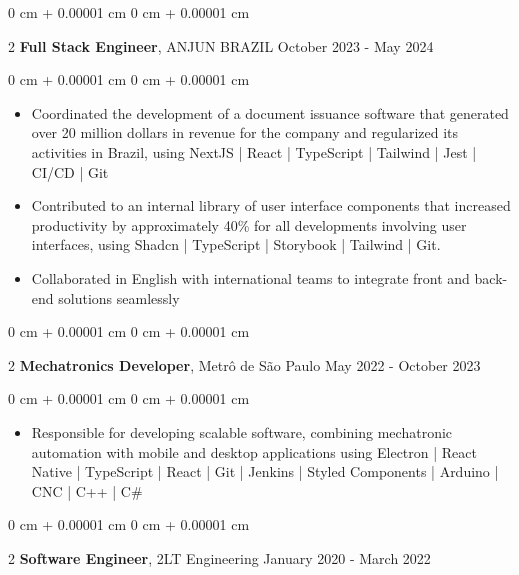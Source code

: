 \documentclass[10pt, letterpaper]{article}
\newenvironment{highlights}{ \begin{itemize}[ topsep=0.10 cm, parsep=0.10 cm, partopsep=0pt,
itemsep=0pt, leftmargin=0 cm + 10pt ] }{ \end{itemize} } %
\newenvironment{onecolentry}{ \begin{adjustwidth}{ 0 cm + 0.00001 cm }{ 0 cm + 0.00001 cm }
}{ \end{adjustwidth} } %
\newenvironment{twocolentry}[2][]{ \onecolentry \def\secondColumn{#2} \setcolumnwidth{\fill, 4.5 cm}
\begin{paracol}{2} }{ \switchcolumn \raggedleft \secondColumn \end{paracol}
\endonecolentry } %
\begin{document}
	\vspace{0.2 cm}
	
	\begin{twocolentry}
		{ October 2023 - May 2024 } \textbf{Full Stack Engineer}, ANJUN BRAZIL
	\end{twocolentry}
	
	\vspace{0.10 cm}
	\begin{onecolentry}
		\begin{highlights}
			\item Coordinated the development of a document issuance software that generated over 20 million dollars in revenue for the company and
            regularized its activities in Brazil, using NextJS | React | TypeScript | Tailwind | Jest | CI/CD | Git            
			\item Contributed to an internal library of user interface components that increased productivity by approximately 40\% for all
            developments involving user interfaces, using Shadcn | TypeScript | Storybook | Tailwind | Git.
            \item Collaborated in English with international teams to integrate front and back-end solutions seamlessly
		\end{highlights}
	\end{onecolentry}
	
	\vspace{0.2 cm}
	
	\begin{twocolentry}
		{ May 2022 - October 2023 } \textbf{Mechatronics Developer}, Metrô de São Paulo
	\end{twocolentry}
	
	\vspace{0.10 cm}
	\begin{onecolentry}
		\begin{highlights}
			\item Responsible for developing scalable software, combining mechatronic automation with mobile and desktop applications
            using Electron | React Native | TypeScript | React | Git | Jenkins | Styled Components | Arduino | CNC | C++ | C\#
		\end{highlights}
	\end{onecolentry}

    \begin{twocolentry}
		{ January 2020 - March 2022 } \textbf{Software Engineer}, 2LT Engineering
	\end{twocolentry}
	
\end{document}
